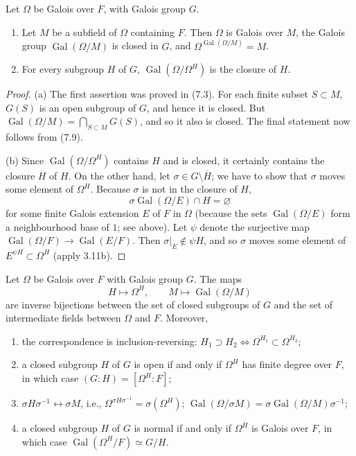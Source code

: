 \begin{proposition}[7.11]
Let $\Omega$ be Galois over $F$, with Galois group $G$.
\begin{enumerate}[label=(\alph*)]
\item Let $M$ be a subfield of $\Omega$ containing $F$. Then $\Omega$ is Galois over $M$, the Galois group $\operatorname{Gal}(\Omega/M)$ is closed in $G$, and $\Omega^{\operatorname{Gal}(\Omega/M)}=M$.
\item For every subgroup $H$ of $G$, $\operatorname{Gal}(\Omega/\Omega^H)$ is the closure of $H$.
\end{enumerate}
\end{proposition}
\begin{proof}
(a) The first assertion was proved in (7.3). For each finite subset $S\subset M$, $G(S)$ is an open subgroup of $G$, and hence it is closed. But $\operatorname{Gal}(\Omega/M)=\bigcap_{S\subset M}G(S)$, and so it also is closed. The final statement now follows from (7.9).

(b) Since $\operatorname{Gal}(\Omega/\Omega^H)$ contains $H$ and is closed, it certainly contains the closure $\overline H$ of $H$. On the other hand, let $\sigma\in G\setminus\overline H$; we have to show that $\sigma$ moves some element of $\Omega^H$. Because $\sigma$ is not in the closure of $H$,
\[
\sigma\operatorname{Gal}(\Omega/E)\cap H=\varnothing
\]
for some finite Galois extension $E$ of $F$ in $\Omega$ (because the sets $\operatorname{Gal}(\Omega/E)$ form a neighbourhood base of $1$; see above). Let $\psi$ denote the surjective map $\operatorname{Gal}(\Omega/F)\to\operatorname{Gal}(E/F)$. Then $\sigma|_E\notin\psi H$, and so $\sigma$ moves some element of $E^{\psi H}\subset\Omega^H$ (apply 3.11b).
\end{proof}
\begin{theorem}[7.12]
Let $\Omega$ be Galois over $F$ with Galois group $G$. The maps
\[
H\longmapsto\Omega^H,\qquad M\longmapsto\operatorname{Gal}(\Omega/M)
\]
are inverse bijections between the set of closed subgroups of $G$ and the set of intermediate fields between $\Omega$ and $F$. Moreover,
\begin{enumerate}[label=(\alph*)]
\item the correspondence is inclusion-reversing: $H_1\supset H_2\Longleftrightarrow\Omega^{H_1}\subset\Omega^{H_2}$;
\item a closed subgroup $H$ of $G$ is open if and only if $\Omega^H$ has finite degree over $F$, in which case $(G:H)=[\Omega^H:F]$;
\item $\sigma H\sigma^{-1}\leftrightarrow\sigma M$, i.e., $\Omega^{\sigma H\sigma^{-1}}=\sigma(\Omega^H)$; $\operatorname{Gal}(\Omega/\sigma M)=\sigma\operatorname{Gal}(\Omega/M)\sigma^{-1}$;
\item a closed subgroup $H$ of $G$ is normal if and only if $\Omega^H$ is Galois over $F$, in which case $\operatorname{Gal}(\Omega^H/F)\simeq G/H$.
\end{enumerate}
\end{theorem}
